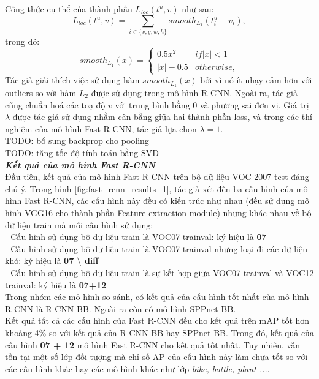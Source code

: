 {    Công thức cụ thể của thành phần $L_{loc}(t^u, v)$ như sau:
    \begin{equation}
        \label{eq:fast_rcnn_bb_loss}
        L_{loc}(t^u, v) = \sum_{i \in \{{x},{y},{w},{h}\}} {smooth}_{L_1}(t^u_i - v_i),
    \end{equation}
    trong đó:
    \begin{equation}
        \label{eq:fast_rcnn_bb_loss_l1}
        {smooth}_{L_1}(x) =
        \begin{cases}
            0.5x^2& {if} |x| < 1 \\
            |x| - 0.5& {otherwise},
        \end{cases}
    \end{equation}
    Tác giả giải thích việc sử dụng hàm ${smooth}_{L_1}(x)$ bởi vì nó ít nhạy cảm hơn với outliers so với hàm ${L_2}$ được sử dụng trong mô hình R-CNN.
    Ngoài ra, tác giả cũng chuẩn hoá các toạ độ $v$ với trung bình bằng 0 và phương sai đơn vị.
    Giá trị $\lambda$ được tác giả sử dụng nhằm cân bằng giữa hai thành phần loss, và trong các thí nghiệm của mô hình Fast R-CNN, tác giả lựa chọn $\lambda = 1$. \\
    TODO: bổ sung backprop cho pooling \\
    TODO: tăng tốc độ tính toán bằng SVD \\

    \noindent
    \textbf{\textit{Kết quả của mô hình Fast R-CNN}} \\
    Đầu tiên, kết quả của mô hình Fast R-CNN trên bộ dữ liệu VOC 2007 test đáng chú ý.
    Trong hình \ref{fig:fast_rcnn_results_1}, tác giả xét đến ba cấu hình của mô hình Fast R-CNN, các cấu hình này đều có kiến trúc như nhau (đều sử dụng mô hình VGG16 cho thành phần Feature extraction module) nhưng khác nhau về bộ dữ liệu train mà mỗi cấu hình sử dụng: \\
    - Cấu hình sử dụng bộ dữ liệu train là VOC07 trainval: ký hiệu là \textbf{07} \\
    - Cấu hình sử dụng bộ dữ liệu train là VOC07 trainval nhưng loại đi các dữ liệu khó: ký hiệu là \textbf{07 $\setminus$ diff} \\
    - Cấu hình sử dụng bộ dữ liệu train là sự kết hợp giữa VOC07 trainval và VOC12 trainval: ký hiệu là \textbf{07+12} \\
    Trong nhóm các mô hình so sánh, có kết quả của cấu hình tốt nhất của mô hình R-CNN là R-CNN BB.
    Ngoài ra còn có mô hình SPPnet BB. \\
    Kết quả tất cả các cấu hình của Fast R-CNN đều cho kết quả trên mAP tốt hơn khoảng 4\% so với kết quả của R-CNN BB hay SPPnet BB.
    Trong đó, kết quả của cấu hình \textbf{07 + 12} mô hình Fast R-CNN cho kết quả tốt nhất.
    Tuy nhiên, vẫn tồn tại một số lớp đối tượng mà chỉ số AP của cấu hình này làm chưa tốt so với các cấu hình khác hay các mô hình khác như lớp \textit{bike, bottle, plant ...}.

}
